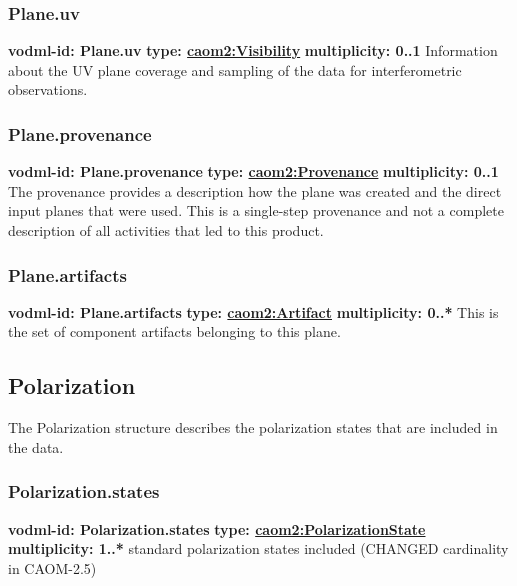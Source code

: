     \subsubsection{Plane.uv}
      \textbf{vodml-id: Plane.uv} \newline
      \textbf{type: \hyperref[sect:Visibility]{caom2:Visibility}} \newline
      \textbf{multiplicity: 0..1} \newline
      Information about the UV plane coverage and sampling of the data for interferometric observations.

    \subsubsection{Plane.provenance}
      \textbf{vodml-id: Plane.provenance} \newline
      \textbf{type: \hyperref[sect:Provenance]{caom2:Provenance}} \newline
      \textbf{multiplicity: 0..1} \newline
      The provenance provides a description how the plane was created and the direct input planes that were used. This is a single-step provenance and not a complete description of all activities that led to this product.

    \subsubsection{Plane.artifacts}
      \textbf{vodml-id: Plane.artifacts} \newline
      \textbf{type: \hyperref[sect:Artifact]{caom2:Artifact}} \newline
      \textbf{multiplicity: 0..*} \newline
      This is the set of component artifacts belonging to this plane.

  \subsection{Polarization}
  \label{sect:Polarization}
    The Polarization structure describes the polarization states that are included in the data.

    \subsubsection{Polarization.states}
      \textbf{vodml-id: Polarization.states} \newline
      \textbf{type: \hyperref[sect:PolarizationState]{caom2:PolarizationState}} \newline
      \textbf{multiplicity: 1..*} \newline
      standard polarization states included (CHANGED cardinality in CAOM-2.5)

